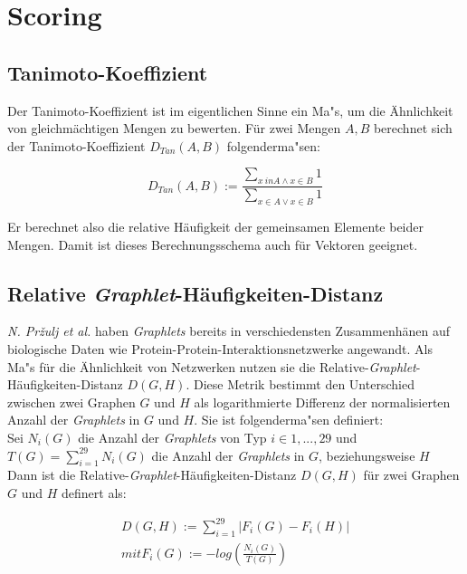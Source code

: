 \documentclass{report}
\begin{document}
\section{Scoring}



\subsection{Tanimoto-Koeffizient}

Der Tanimoto-Koeffizient ist im eigentlichen Sinne ein Ma"s, um die \"Ahnlichkeit von gleichm\"achtigen Mengen zu bewerten. F\"ur zwei Mengen $A,B$ berechnet sich der Tanimoto-Koeffizient $D_{Tan}(A,B)$ folgenderma"sen:

\[ D_{Tan}(A,B) := \frac{\sum_{x \ in A \land x \in B} 1}{\sum_{x \in A \lor x \in B} 1} \]

Er berechnet also die relative H\"aufigkeit der gemeinsamen Elemente beider Mengen. Damit ist dieses Berechnungsschema auch f\"ur Vektoren geeignet.

\subsection{Relative \textit{Graphlet}-H\"aufigkeiten-Distanz}

\textit{N. Pr\v{z}ulj et al.} haben \textit{Graphlets} bereits in verschiedensten Zusammenh\"anen auf biologische Daten wie Protein-Protein-Interaktionsnetzwerke \cite{frqdistribution} angewandt. Als Ma"s f\"ur die \"Ahnlichkeit von Netzwerken nutzen sie die Relative-\textit{Graphlet}-H\"aufigkeiten-Distanz $D(G,H)$. Diese Metrik bestimmt den Unterschied zwischen zwei Graphen $G$ und $H$ als logarithmierte Differenz der normalisierten Anzahl der \textit{Graphlets} in $G$ und $H$. Sie ist folgenderma"sen definiert: \\

Sei $N_{i}(G)$ die Anzahl der \textit{Graphlets} von Typ $i \in {1,...,29}$ und \\ $T(G) = \sum_{i = 1}^{29} N_{i}(G)$ die Anzahl der \textit{Graphlets} in $G$, beziehungsweise $H$\\

Dann ist die Relative-\textit{Graphlet}-H\"aufigkeiten-Distanz $D(G,H)$ f\"ur zwei Graphen $G$ und $H$ definert als:

\begin{subequations}
\begin{align}
D(G,H) := \sum_{i = 1}^{29} | F_{i}(G) - F_{i}(H) | \\
mit F_{i}(G) := - log(\frac{N_{i}(G)}{T(G)})
\end{align}
\end{subequations}
\end{document}
